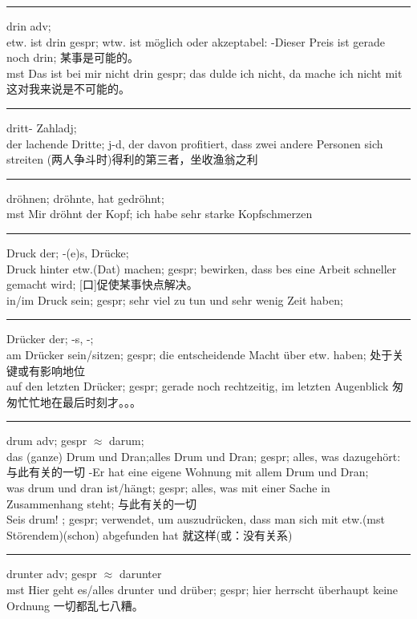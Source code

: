 \noindent\rule{\textwidth}{1pt}
drin adv;\\
etw. ist drin gespr; wtw. ist m\"oglich oder akzeptabel: -Dieser Preis ist gerade noch drin; 某事是可能的。\\
mst Das ist bei mir nicht drin gespr; das dulde ich nicht, da mache ich nicht mit 这对我来说是不可能的。\\

\noindent\rule{\textwidth}{1pt}
dritt- Zahladj; \\
der lachende Dritte; j-d, der davon profitiert, dass zwei andere Personen sich streiten (两人争斗时)得利的第三者，坐收渔翁之利\\

\noindent\rule{\textwidth}{1pt}
dr\"ohnen; dr\"ohnte, hat gedr\"ohnt; \\
mst Mir dr\"ohnt der Kopf; ich habe sehr starke Kopfschmerzen \\

\noindent\rule{\textwidth}{1pt}
Druck der; -(e)s, Dr\"ucke; \\
Druck hinter etw.(Dat) machen; gespr; bewirken, dass bes eine Arbeit schneller gemacht wird; [口]促使某事快点解决。\\
in/im Druck sein; gespr; sehr viel zu tun und sehr wenig Zeit haben;  \\

\noindent\rule{\textwidth}{1pt}
Dr\"ucker der; -s, -;\\
am Dr\"ucker sein/sitzen; gespr; die entscheidende Macht \"uber etw. haben; 处于关键或有影响地位\\
auf den letzten Dr\"ucker; gespr; gerade noch rechtzeitig, im letzten Augenblick 匆匆忙忙地在最后时刻才。。。\\

\noindent\rule{\textwidth}{1pt}
drum adv; gespr $\approx$ darum;\\
das (ganze) Drum und Dran;alles Drum und Dran; gespr; alles, was dazugeh\"ort:与此有关的一切 -Er hat eine eigene Wohnung mit allem Drum und Dran;\\
was drum und dran ist/h\"angt; gespr; alles, was mit einer Sache in Zusammenhang steht; 与此有关的一切\\
Seis drum! ; gespr; verwendet, um auszudr\"ucken, dass man sich mit etw.(mst St\"orendem)(schon) abgefunden hat 就这样(或：没有关系)\\

\noindent\rule{\textwidth}{1pt}
drunter adv; gespr $\approx$ darunter \\
mst Hier geht es/alles drunter und dr\"uber; gespr; hier herrscht \"uberhaupt keine Ordnung 一切都乱七八糟。\\

